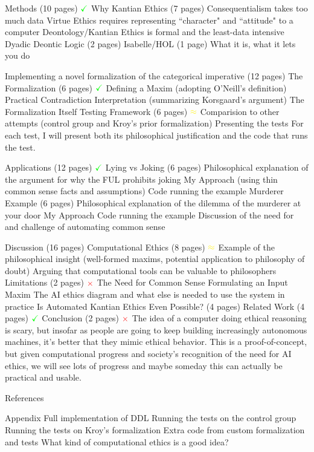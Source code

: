 \documentclass[11pt]{article}
\begin{document}
\begin{outline}[enumerate]
\1 Methods (10 pages) \hfill $\color{green} \mathbf{\checkmark} \color{black}$
\2 Why Kantian Ethics (7 pages)
\3 Consequentialism takes too much data
\3 Virtue Ethics requires representing ``character" and ``attitude" to a computer
\3 Deontology/Kantian Ethics is formal and the least-data intensive
\2 Dyadic Deontic Logic (2 pages) 
\2 Isabelle/HOL (1 page) 
\3 What it is, what it lets you do

\1 Implementing a novel formalization of the categorical imperative (12 pages)
\2 The Formalization (6 pages) \hfill $\color{green} \mathbf{\checkmark} \color{black}$
\3 Defining a Maxim (adopting O'Neill's definition) 
\3 Practical Contradiction Interpretation (summarizing Korsgaard's argument)
\3 The Formalization Itself 
\2 Testing Framework (6 pages)  \hfill $\color{yellow} \mathbf{\approx} \color{black}$
\3 Comparision to other attempts (control group and Kroy's prior formalization)
\3 Presenting the tests
\4 For each test, I will present both its philosophical justification and the code that runs the test.

\1 Applications (12 pages) \hfill $\color{green} \mathbf{\checkmark} \color{black}$
\2 Lying vs Joking (6 pages)
\3 Philosophical explanation of the argument for why the FUL prohibits joking
\3 My Approach (using thin common sense facts and assumptions)
\3 Code running the example
\2 Murderer Example (6 pages)
\3 Philosophical explanation of the dilemma of the murderer at your door
\3 My Approach 
\3 Code running the example
\3 Discussion of the need for and challenge of automating common sense 

\1 Discussion (16 pages)
\2 Computational Ethics (8 pages) \hfill $\color{yellow} \mathbf{\approx} \color{black}$
\3 Example of the philosophical insight (well-formed maxims, potential application to philosophy of doubt)
\3 Arguing that computational tools can be valuable to philosophers
\2 Limitations (2 pages) \hfill $\color{red} \mathbf{\times} \color{black}$
\3 The Need for Common Sense 
\3 Formulating an Input Maxim
\3 The AI ethics diagram and what else is needed to use the system in practice
\2 Is Automated Kantian Ethics Even Possible? (4 pages)
\2 Related Work (4 pages) \hfill $\color{green} \mathbf{\checkmark} \color{black}$
\2 Conclusion (2 pages) \hfill $\color{red} \mathbf{\times} \color{black}$
\3 The idea of a computer doing ethical reasoning is scary, but insofar as people are going to keep
building increasingly autonomous machines, it's better that they mimic ethical behavior. 
\3 This is a proof-of-concept, but given computational progress and society's recognition of the need for
AI ethics, we will see lots of progress and maybe someday this can actually be practical and usable.

\1 References 

\1 Appendix 
\2 Full implementation of DDL
\2 Running the tests on the control group 
\2 Running the tests on Kroy's formalization
\2 Extra code from custom formalization and tests
\2 What kind of computational ethics is a good idea? 


\end{outline}
\end{document}
